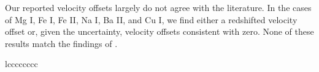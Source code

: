\documentclass[twocolumn]{aastex631}
\begin{document}
            Our reported velocity offsets largely do not agree with the literature. In the cases of Mg I, Fe I, Fe II, Na I, Ba II, and Cu I, we find either a redshifted velocity offset or, given the uncertainty, velocity offsets consistent with zero. None of these results match the findings of \citet{CasasayasBarris2019, Stangret2020, Hoeijmakers2020, Nugroho2020, Rainer2021, Langeveld2022, BelloArufe2022}.


            \begin{deluxetable*}{lcccccccc}\label{tab:detection-summary}
                \tablecaption{}
                

\end{deluxetable*}
\end{document}
